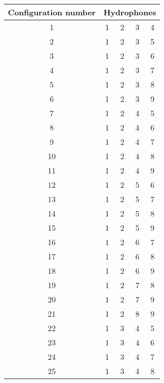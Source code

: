 \begin{longtable}{c | c c c c}
			\toprule
			\multicolumn{1}{c|}{Configuration number} & \multicolumn{4}{c}{Hydrophones}  \\
			\midrule 
			\multicolumn{1}{c|}{1} & 1 & 2 & 3 & 4 \\ 
			\midrule 
			\multicolumn{1}{c|}{2} & 1 & 2 & 3 & 5 \\ 
			\midrule 
			\multicolumn{1}{c|}{3} & 1 & 2 & 3 & 6 \\ 
			\midrule 
			\multicolumn{1}{c|}{4} & 1 & 2 & 3 & 7 \\ 
			\midrule 
			\multicolumn{1}{c|}{5} & 1 & 2 & 3 & 8 \\ 
			\midrule 
			\multicolumn{1}{c|}{6} & 1 & 2 & 3 & 9 \\ 
			\midrule 
			\multicolumn{1}{c|}{7} & 1 & 2 & 4 & 5 \\ 
			\midrule 
			\multicolumn{1}{c|}{8} & 1 & 2 & 4 & 6 \\ 
			\midrule 
			\multicolumn{1}{c|}{9} & 1 & 2 & 4 & 7 \\ 
			\midrule 
			\multicolumn{1}{c|}{10} & 1 & 2 & 4 & 8 \\ 
			\midrule 
			\multicolumn{1}{c|}{11} & 1 & 2 & 4 & 9 \\ 
			\midrule 
			\multicolumn{1}{c|}{12} & 1 & 2 & 5 & 6 \\ 
			\midrule 
			\multicolumn{1}{c|}{13} & 1 & 2 & 5 & 7 \\ 
			\midrule 
			\multicolumn{1}{c|}{14} & 1 & 2 & 5 & 8 \\ 
			\midrule 
			\multicolumn{1}{c|}{15} & 1 & 2 & 5 & 9 \\ 
			\midrule 
			\multicolumn{1}{c|}{16} & 1 & 2 & 6 & 7 \\ 
			\midrule 
			\multicolumn{1}{c|}{17} & 1 & 2 & 6 & 8 \\ 
			\midrule 
			\multicolumn{1}{c|}{18} & 1 & 2 & 6 & 9 \\ 
			\midrule 
			\multicolumn{1}{c|}{19} & 1 & 2 & 7 & 8 \\ 
			\midrule 
			\multicolumn{1}{c|}{20} & 1 & 2 & 7 & 9 \\ 
			\midrule 
			\multicolumn{1}{c|}{21} & 1 & 2 & 8 & 9 \\ 
			\midrule 
			\multicolumn{1}{c|}{22} & 1 & 3 & 4 & 5 \\ 
			\midrule 
			\multicolumn{1}{c|}{23} & 1 & 3 & 4 & 6 \\ 
			\midrule 
			\multicolumn{1}{c|}{24} & 1 & 3 & 4 & 7 \\ 
			\midrule 
			\multicolumn{1}{c|}{25} & 1 & 3 & 4 & 8 \\ 

\end{longtable}
